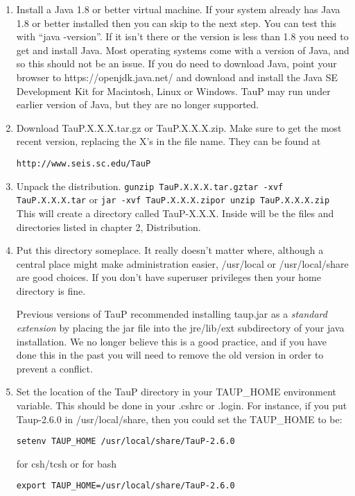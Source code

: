 \begin{enumerate}
\item Install a Java 1.8 or better virtual machine. If your system already has Java 1.8
or better installed then you can skip to the next step. You can test this
with ``java -version''. If it isn't there or the version is less than 1.8
you need to get and install Java. Most operating systems come with a version
of Java, and so this should not be an issue. If you do need to download Java,
point
your browser to https://openjdk.java.net/ and download and install
the Java SE Development Kit for Macintosh, Linux or Windows. TauP may run under earlier version of Java, but they are no longer supported.

\item Download TauP.X.X.X.tar.gz or TauP.X.X.X.zip. Make sure to get the most recent version, replacing the X's  in the file name. They can be found at

\texttt{http://www.seis.sc.edu/TauP}

\item Unpack the distribution.
\texttt{\newline gunzip TauP.X.X.X.tar.gz\newline tar -xvf TauP.X.X.X.tar\newline}
or
\texttt{\newline jar -xvf TauP.X.X.X.zip\newline or unzip TauP.X.X.X.zip}
This will create a directory called TauP-X.X.X. Inside
will be the files and directories listed in chapter 2, Distribution.

\item Put this directory someplace. It really doesn't matter where, although
a central place might make administration easier, /usr/local or
/usr/local/share are good choices. If you don't have superuser privileges
then your home directory is fine.

Previous versions of TauP recommended installing taup.jar as a \textit{standard extension} by placing the jar file into the jre/lib/ext subdirectory of your java installation. We no longer believe this is a good
practice, and if you have done this in the past you will need to remove the old version in order to
prevent a conflict.

\item Set the location of the TauP directory in your TAUP\_HOME environment variable.
This should be done in your .cshrc or .login. For instance, if you put Taup-2.6.0 in
/usr/local/share, then you could set the TAUP\_HOME to be:
\begin{verbatim}
setenv TAUP_HOME /usr/local/share/TauP-2.6.0
\end{verbatim}
for csh/tcsh or for bash
\begin{verbatim}
export TAUP_HOME=/usr/local/share/TauP-2.6.0
\end{verbatim}


\end{enumerate}
